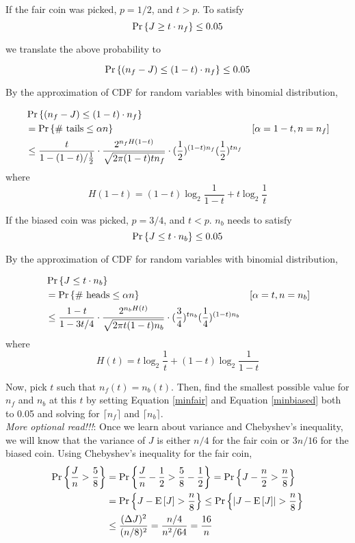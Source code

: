 \documentclass[twoside,12pt]{article}
\providecommand{\abs}[1]{\lvert#1\rvert}
\newcommand{\variance}[1]{(\Delta{#1})^2}
\begin{document}
\begin{problem}{7}
{If the fair coin was picked, $p = 1/2$, and $t > p$.  To satisfy 
\[
\mathop{\textup{Pr}}\nolimits\left\{J \ge t \cdot n_{f}\right\} \leq 0.05
\]

we translate the above probability to 

\[
\mathop{\textup{Pr}}\nolimits\left\{(n_{f}-J) \le (1-t) \cdot n_{f}\right\} \leq 0.05
\]

By the approximation of CDF for random variables with binomial distribution,

\begin{equation}\label{minfair}
\begin{align*}
&\mathop{\textup{Pr}}\nolimits\left\{(n_{f}-J) \le (1-t) \cdot n_{f}\right\}\\
& = \mathop{\textup{Pr}}\nolimits\left\{\text{\# tails} \leq \alpha n\right\}  & [\alpha = 1-t,  n=n_{f}]\\
    & \leq \frac{t}{1 - (1-t) / \frac{1}{2}} \cdot
           \frac{2^{n_{f} H(1-t)}}{\sqrt{2 \pi (1-t) t n_{f}}} 
           \cdot (\frac{1}{2})^{(1-t) n_{f}} (\frac{1}{2})^{t n_{f}}   
\end{align*}
\end{equation}
%
where
%
\[
H(1-t) = (1-t) \log_2 \frac{1}{1-t} +
		t \log_2 \frac{1}{t}
\]

If the biased coin was picked, $p = 3/4$, and $t < p$.  $n_{b}$ needs to satisfy 
\[
\mathop{\textup{Pr}}\nolimits\left\{J \le t \cdot n_{b}\right\} \leq 0.05
\]

By the approximation of CDF for random variables with binomial distribution,

\begin{equation}\label{minbiased}
\begin{align*}
&\mathop{\textup{Pr}}\nolimits\left\{J \le t \cdot n_{b}\right\}\\
& = \mathop{\textup{Pr}}\nolimits\left\{\text{\# heads} \leq \alpha n\right\}  & [\alpha = t,  n=n_{b}]\\
    & \leq \frac{1 - t}{1 - 3t/4} \cdot
           \frac{2^{n_{b} H(t)}}{\sqrt{2 \pi t (1 - t) n_{b}}} 
           \cdot (\frac{3}{4})^{t n_{b}} (\frac{1}{4})^{(1 - t) n_{b}} 
\end{align*}
\end{equation}
%
where
%
\[
H(t) = t \log_2 \frac{1}{t} +
		(1 - t) \log_2 \frac{1}{1 - t}
\]

Now, pick $t$ such that  $n_{f}(t) = n_{b}(t)$.  Then, find the smallest possible 
value for $n_{f}$ and $n_{b}$ at this $t$ by setting Equation \eqref{minfair} and 
Equation \eqref{minbiased} both to 0.05 and solving for $\lceil n_{f} \rceil$ and $\lceil n_{b} \rceil$. \\

\iffalse
\emph{More optional read!!!}:  Once we learn about variance and Chebyshev's inequality, we will 
know that the variance of $J$ is either $n/4$ for the fair coin
or $3n/16$ for the biased coin.  Using Chebyshev's inequality for the fair
coin,
\begin{align*}
\pr{\frac{J}{n} > \frac{5}{8}} & =
  \pr{\frac{J}{n} - \frac{1}{2} > \frac{5}{8} - \frac{1}{2}}
  = \pr{J - \frac{n}{2} > \frac{n}{8} } \\
& = \pr{J - \expect{J} > \frac{n}{8} } \leq
  \pr{ \abs{J - \expect{J}} > \frac{n}{8} } \\
& \leq \frac{\variance{J}}{(n/8)^2} = \frac{n/4}{n^2/64}
  = \frac{16}{n}
\end{align*}

}
\end{problem}
\end{document}

